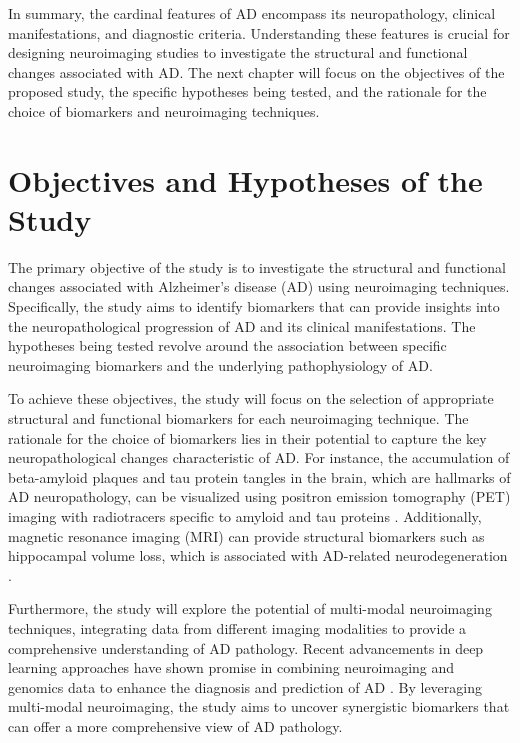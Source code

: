 \documentclass[10pt]{article}
\begin{document}
\begin{sloppypar}
  In summary, the cardinal features of AD encompass its neuropathology, clinical manifestations, and diagnostic criteria. Understanding these features is crucial for designing neuroimaging studies to investigate the structural and functional changes associated with AD. The next chapter will focus on the objectives of the proposed study, the specific hypotheses being tested, and the rationale for the choice of biomarkers and neuroimaging techniques.

  \section{Objectives and Hypotheses of the Study}
  \label{sec:objectives-and-hypotheses}

  The primary objective of the study is to investigate the structural and functional changes associated with Alzheimer's disease (AD) using neuroimaging techniques. Specifically, the study aims to identify biomarkers that can provide insights into the neuropathological progression of AD and its clinical manifestations. The hypotheses being tested revolve around the association between specific neuroimaging biomarkers and the underlying pathophysiology of AD.

  To achieve these objectives, the study will focus on the selection of appropriate structural and functional biomarkers for each neuroimaging technique. The rationale for the choice of biomarkers lies in their potential to capture the key neuropathological changes characteristic of AD. For instance, the accumulation of beta-amyloid plaques and tau protein tangles in the brain, which are hallmarks of AD neuropathology, can be visualized using positron emission tomography (PET) imaging with radiotracers specific to amyloid and tau proteins \citep{bao_pet_2021}. Additionally, magnetic resonance imaging (MRI) can provide structural biomarkers such as hippocampal volume loss, which is associated with AD-related neurodegeneration \citep{besson_cognitive_2015}.

  Furthermore, the study will explore the potential of multi-modal neuroimaging techniques, integrating data from different imaging modalities to provide a comprehensive understanding of AD pathology. Recent advancements in deep learning approaches have shown promise in combining neuroimaging and genomics data to enhance the diagnosis and prediction of AD \citep{lin_deep_2021}. By leveraging multi-modal neuroimaging, the study aims to uncover synergistic biomarkers that can offer a more comprehensive view of AD pathology.


\end{sloppypar}
\end{document}
